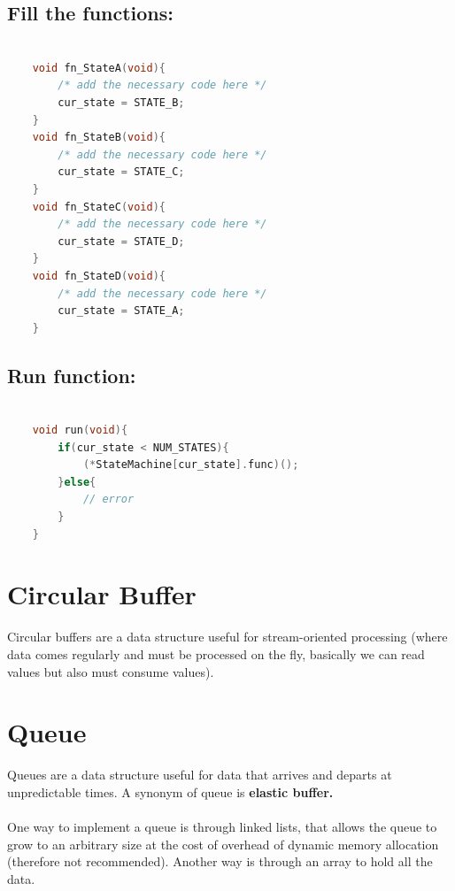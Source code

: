 \newpage

\subsection{Fill the functions:}

\begin{lstlisting}[language=c++]

    void fn_StateA(void){
        /* add the necessary code here */
        cur_state = STATE_B;
    }
    void fn_StateB(void){
        /* add the necessary code here */
        cur_state = STATE_C;
    }
    void fn_StateC(void){
        /* add the necessary code here */
        cur_state = STATE_D;
    }
    void fn_StateD(void){
        /* add the necessary code here */
        cur_state = STATE_A;
    }
\end{lstlisting}



\subsection{Run function:}
\begin{lstlisting}[language=c++]

    void run(void){    
        if(cur_state < NUM_STATES){
            (*StateMachine[cur_state].func)();
        }else{
            // error
        }
    }
\end{lstlisting}

\section{Circular Buffer}

Circular buffers are a data structure useful for stream-oriented processing (where data comes regularly
and must be processed on the fly, basically we can read values but also must consume values).

\section{Queue}

Queues are a data structure useful for data that arrives and departs at unpredictable times.
A synonym of queue is \textbf{elastic buffer.}
\paragraph{}
One way to implement a queue is through linked lists, that allows the queue to grow to an arbitrary size at
the cost of overhead of dynamic memory allocation (therefore not recommended).
Another way is through an array to hold all the data.

